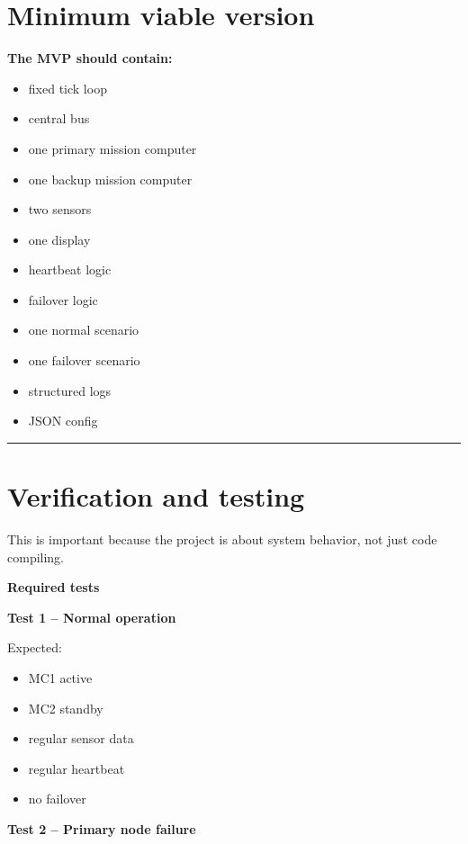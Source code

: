 \documentclass{report}
\begin{document}
\section{Minimum viable version}

\textbf{The MVP should contain:}
\begin{itemize}
   \item fixed tick loop
   \item central bus
   \item one primary mission computer
   \item one backup mission computer
   \item two sensors
   \item one display
   \item heartbeat logic
   \item failover logic
   \item one normal scenario
   \item one failover scenario
   \item structured logs
   \item JSON config
\end{itemize}


\begin{center}
\rule{0.9\textwidth}{1pt}
\end{center}
\section{Verification and testing}

This is important because the project is about system behavior, not just code compiling.

\textbf{Required tests}

\textbf{Test 1 -- Normal operation}

Expected:
\begin{itemize}
   \item MC1 active
   \item MC2 standby
   \item regular sensor data
   \item regular heartbeat
   \item no failover
\end{itemize}

\textbf{Test 2 -- Primary node failure}
\end{document}
